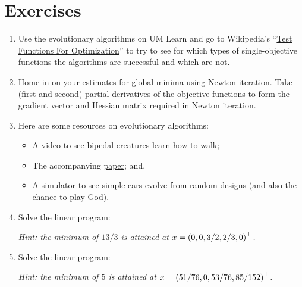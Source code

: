 \documentclass[11pt,letterpaper]{article}
\begin{document}
\section*{Exercises}

\begin{enumerate}

\item Use the evolutionary algorithms on UM Learn and go to Wikipedia's ``\href{https://en.wikipedia.org/wiki/Test_functions_for_optimization}{Test Functions For Optimization}'' to try to see for which types of single-objective functions the algorithms are successful and which are not.

\item Home in on your estimates for global minima using Newton iteration. Take (first and second) partial derivatives of the objective functions to form the gradient vector and Hessian matrix required in Newton iteration.

\item Here are some resources on evolutionary algorithms:
\begin{itemize}
\item A \href{https://vimeo.com/79098420}{video} to see bipedal creatures learn how to walk;

\item The accompanying \href{http://www.cs.ubc.ca/~van/papers/2013-TOG-MuscleBasedBipeds/2013-TOG-MuscleBasedBipeds.pdf}{paper}; and,
\item A \href{http://boxcar2d.com}{simulator} to see simple cars evolve from random designs (and also the chance to play God).
\end{itemize}

\item Solve the linear program:

{\em Hint: the minimum of $13/3$ is attained at $x = \pr(0,0,3/2,2/3,0)^\top$.}

\item Solve the linear program:

{\em Hint: the minimum of $5$ is attained at $x = \pr(51/76,0,53/76,85/152)^\top$.}

\end{enumerate}
\end{document}
